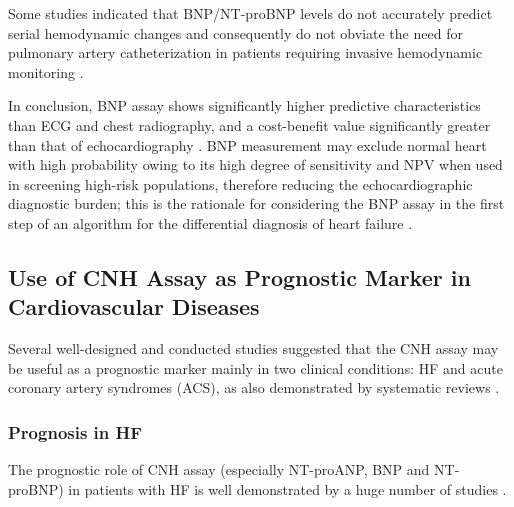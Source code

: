 \documentclass[14pt,a4paper,onecolumn]{extarticle}
\begin{document}
Some  studies indicated that BNP/NT-proBNP levels do not accurately predict serial hemodynamic changes and consequently do not obviate the need for pulmonary artery catheterization in patients requiring invasive hemodynamic monitoring \citep{bib3182} \citep{bib3183} \citep{bib3184}.

In conclusion, BNP assay shows significantly higher predictive characteristics than ECG and chest radiography, and a cost-benefit value significantly greater than that of echocardiography \citep{bib392} \citep{bib3170}. BNP measurement may exclude normal heart with high probability owing to its high degree of sensitivity and NPV when used in screening high-risk populations, therefore reducing the echocardiographic diagnostic burden; this is the rationale for considering the BNP assay in the first step of an algorithm for the differential diagnosis of heart failure \citep{bib337} \citep{bib365} \citep{bib369} \citep{bib370} \citep{bib3168} \citep{bib3175}.


\subsection{ Use of CNH Assay as Prognostic Marker in Cardiovascular Diseases}

Several well-designed and conducted studies suggested that the CNH assay may be useful as a prognostic marker mainly in two clinical conditions: HF and acute coronary artery syndromes (ACS), as also demonstrated by systematic reviews \citep{bib35} \citep{bib376} \citep{bib3184} \citep{bib3185}.

\subsubsection{ Prognosis in HF}

The prognostic role of CNH assay (especially NT-proANP, BNP and NT-proBNP) in patients with HF is well demonstrated by a huge number of studies \citep{bib316} \citep{bib3147} \citep{bib3186} \citep{bib3187} \citep{bib3188} \citep{bib3189} \citep{bib3190} \citep{bib3191} \citep{bib3192} \citep{bib3193} \citep{bib3194} \citep{bib3195} \citep{bib3196} \citep{bib3197} \citep{bib3198} \citep{bib3199}.
\end{document}
